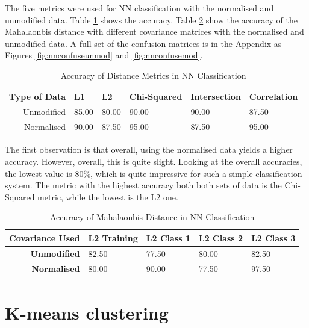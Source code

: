 \documentclass[a4paper, 10pt, conference]{ieeeconf}
\begin{document}
The five metrics were used for NN classification with the normalised and unmodified data. Table \ref{tbl:nn} shows the accuracy. Table \ref{tbl:nnmaha} show the accuracy of the Mahalaonbis distance with different covariance matrices with the normalised and unmodified data. A full set of the confusion matrices is in the Appendix as Figures \ref{fig:nnconfuseunmod} and \ref{fig:nnconfusemod}.

\begin{table}[!ht]
\centering
\caption{Accuracy of Distance Metrics in NN Classification}
\label{tbl:nn}
\begin{tabular}{|r|lllll|}
\hline
\textbf{Type of Data} & \textbf{L1} & \textbf{L2} & \textbf{Chi-Squared} & \textbf{Intersection} & \textbf{Correlation}\\ \hline
Unmodified & 85.00 & 80.00 & 90.00 & 90.00 & 87.50\\
Normalised & 90.00 & 87.50 & 95.00 & 87.50 & 95.00\\ \hline
\end{tabular}
\end{table}

The first observation is that overall, using the normalised data yields a higher accuracy. However, overall, this is quite slight. Looking at the overall accuracies, the lowest value is 80\%, which is quite impressive for such a simple classification system. The metric with the highest accuracy both both sets of data is the Chi-Squared metric, while the lowest is the L2 one.

\begin{table}[!ht]
\centering
\caption{Accuracy of Mahalaonbis Distance in NN Classification}
\label{tbl:nnmaha}
\begin{tabular}{|r|llll|}
\hline
\textbf{Covariance Used} & L2 Training & L2 Class 1 & L2 Class 2 & L2 Class 3\\ \hline
\textbf{Unmodified} & 82.50 & 77.50 & 80.00 & 82.50\\
\textbf{Normalised} & 80.00 & 90.00 & 77.50 & 97.50\\ \hline
\end{tabular}
\end{table}


\section{K-means clustering}
\end{document}
